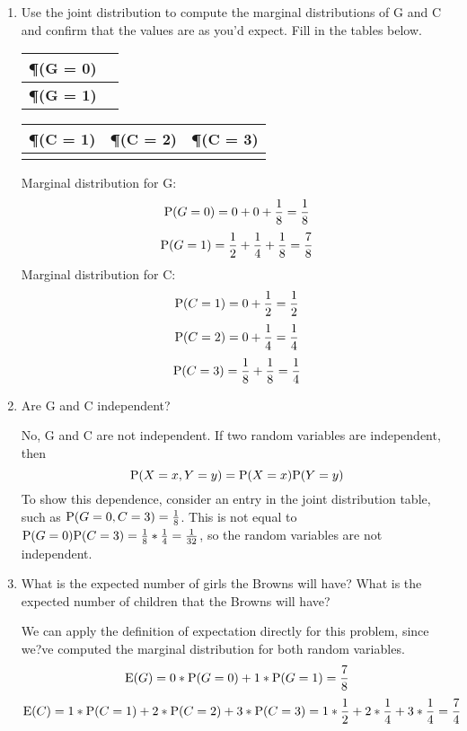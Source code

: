 \begin{enumerate}[label=(\alph*)]
\item Use the joint distribution to compute the marginal distributions of G and C and confirm that the values are as you'd expect. Fill in the tables below. 
\begin{center}
\begin{tabular}{|l|l|}
\hline
\textbf{\P(G = 0)} &  \\ \hline
\textbf{\P(G = 1)} &  \\ \hline
\end{tabular}
\begin{tabular}{|l|l|l|}
\hline
\textbf{\P(C = 1)} & \textbf{\P(C = 2)} & \textbf{\P(C = 3)} \\ \hline
                  &                   &                   \\ \hline
\end{tabular}
\end{center}
\begin{solution}[.75 cm]
Marginal distribution for G:
\[\P(G = 0) = 0 + 0 + \frac{1}{8} = \frac{1}{8}\]
\[\P(G = 1) = \frac{1}{2} + \frac{1}{4} + \frac{1}{8} = \frac{7}{8}\]
Marginal distribution for C:
\[\P(C = 1) = 0 + \frac{1}{2} = \frac{1}{2}\]
\[\P(C = 2) = 0 + \frac{1}{4} = \frac{1}{4}\]
\[\P(C = 3) = \frac{1}{8} + \frac{1}{8} = \frac{1}{4}\]
\end{solution}

\item Are G and C independent?
\begin{solution}[3 mm]
No, G and C are not independent. If two random variables are independent, then
\[\P(X = x, Y = y) = \P(X = x)\P(Y = y)\]
To show this dependence, consider an entry in the joint distribution table, such as
$\P(G = 0, C = 3) = \frac{1}{8}$. This is not equal to $\P(G = 0)\P(C = 3) = \frac{1}{8}*\frac{1}{4} = \frac{1}{32}$, so the random variables are not independent.
\end{solution}

\item What is the expected number of girls the Browns will have? What is the expected number of
children that the Browns will have?
\begin{solution}[1 cm]
We can apply the definition of expectation directly for this problem, since we?ve computed the
marginal distribution for both random variables.
\[\E(G) = 0*\P(G = 0) + 1*\P(G = 1) = \frac{7}{8}\]
\[\E(C) = 1*\P(C = 1) + 2*\P(C = 2) + 3*\P(C = 3) = 1*\frac{1}{2} + 2*\frac{1}{4} + 3*\frac{1}{4} = \frac{7}{4}\]
\end{solution}
\end{enumerate}
